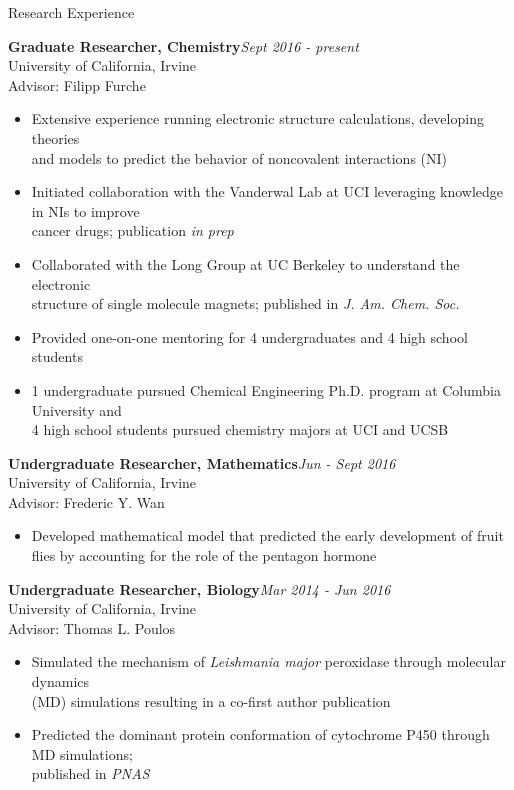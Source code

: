 \documentclass{resume} %
\begin{document}
\begin{rSection}{Research Experience}

\textbf{Graduate Researcher, Chemistry}\hfill {\em Sept 2016 - present}\\
University of California, Irvine\\
Advisor: Filipp Furche
\vspace{-0.5em}
\begin{itemize}    
\itemsep-0.65em
\item Extensive experience running electronic structure calculations, developing theories \\
  and models to predict the behavior of noncovalent interactions (NI)
\item Initiated collaboration with the Vanderwal Lab at UCI leveraging knowledge in NIs to improve\\
  cancer drugs; publication \textit{in prep}
\item Collaborated with the Long Group at UC Berkeley to understand the electronic \\
  structure of single molecule magnets; published in \textit{J. Am. Chem. Soc.}
\item Provided one-on-one mentoring for 4 undergraduates %
  and 4 high school students %
\item 1 undergraduate pursued Chemical Engineering Ph.D. program at Columbia University and \\
  4 high school students pursued chemistry majors at UCI and UCSB
\end{itemize}

\textbf{Undergraduate Researcher, Mathematics}\hfill {\em Jun - Sept 2016}\\
University of California, Irvine \\
Advisor: Frederic Y. Wan
\vspace{-0.5em}
\begin{itemize}
\itemsep-0.65em
\item Developed mathematical model that predicted the early development of fruit \\
  flies by accounting for the role of the pentagon hormone
\end{itemize}
  
\textbf{Undergraduate Researcher, Biology}\hfill {\em Mar 2014 - Jun 2016}\\
University of California, Irvine \\
Advisor: Thomas L. Poulos
\vspace{-0.5em}
\begin{itemize}
\itemsep-0.65em
\item Simulated the mechanism of \textit{Leishmania major} peroxidase through
  molecular dynamics\\
  (MD) simulations resulting in a co-first author publication
\item Predicted the dominant protein conformation of cytochrome P450 through
  MD simulations; \\
  published in \textit{PNAS}
\end{itemize}


\end{rSection}
\end{document}
